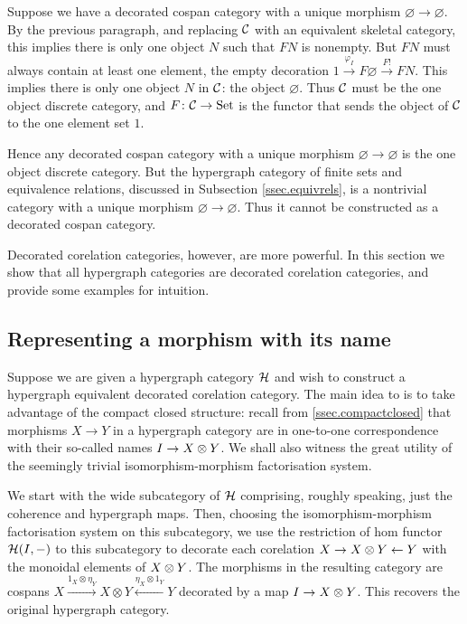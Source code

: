 Suppose we have a decorated cospan category with a unique morphism $\varnothing
\to \varnothing$. By the previous paragraph, and replacing $\mathcal C$ with an
equivalent skeletal category, this implies there is only one object $N$ such
that $FN$ is nonempty. But $FN$ must always contain at least one element, the
empty decoration $1 \xrightarrow{\varphi_I} F\varnothing \xrightarrow{F!} FN$.
This implies there is only one object $N$ in $\mathcal C$: the object $\varnothing$.
Thus $\mathcal C$ must be the one object discrete category, and $F{\colon} \mathcal C \to
\mathrm{Set}$ is the functor that sends the object of $\mathcal C$ to the one element set
$1$.

Hence any decorated cospan category with a unique morphism $\varnothing \to
\varnothing$ is the one object discrete category. But the hypergraph
category of finite sets and equivalence relations, discussed in Subsection
\ref{ssec.equivrels}, is a nontrivial category with a unique morphism
$\varnothing \to \varnothing$.  Thus it cannot be constructed as a decorated
cospan category.

Decorated corelation categories, however, are more powerful. In this section we
show that all hypergraph categories are decorated corelation categories, and
provide some examples for intuition.

\subsection{Representing a morphism with its name}
Suppose we are given a hypergraph category $\mathcal H$ and wish to construct a
hypergraph equivalent decorated corelation category. The main idea to is to take
advantage of the compact closed structure: recall from
\textsection\ref{ssec.compactclosed} that morphisms $X \to Y$ in a hypergraph
category are in one-to-one correspondence with their so-called names $I \to X\otimes
Y$. We shall also witness the great utility of the seemingly trivial
isomorphism-morphism factorisation system. 

We start with the wide subcategory of $\mathcal H$ comprising, roughly speaking, just
the coherence and hypergraph maps. Then, choosing the isomorphism-morphism
factorisation system on this subcategory, we use the restriction of hom functor
$\mathcal H(I,-)$ to this subcategory to decorate each corelation $X \to X \otimes Y
\leftarrow Y$ with the monoidal elements of $X\otimes Y$.  The morphisms in the
resulting category are cospans $X \xrightarrow{1_X \otimes \eta_Y} X\otimes Y
\xleftarrow{\eta_X \otimes 1_Y} Y$ decorated by a map $I \to X \otimes Y$. This
recovers the original hypergraph category.


